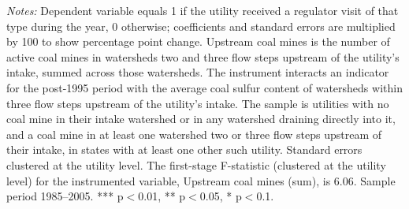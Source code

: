 \begin{table}[htbp]
\begin{minipage}{\linewidth}
\textit{Notes:} Dependent variable equals 1 if the utility received a regulator visit of that type during the year, 0 otherwise; coefficients and standard errors are multiplied by 100 to show percentage point change. Upstream coal mines is the number of active coal mines in watersheds two and three flow steps upstream of the utility's intake, summed across those watersheds. The instrument interacts an indicator for the post-1995 period with the average coal sulfur content of watersheds within three flow steps upstream of the utility's intake. The sample is utilities with no coal mine in their intake watershed or in any watershed draining directly into it, and a coal mine in at least one watershed two or three flow steps upstream of their intake, in states with at least one other such utility. Standard errors clustered at the utility level. The first-stage F-statistic (clustered at the utility level) for the instrumented variable, Upstream coal mines (sum), is 6.06. Sample period 1985--2005. *** p$<$0.01, ** p$<$0.05, * p$<$0.1.
\end{minipage}
\end{table}
